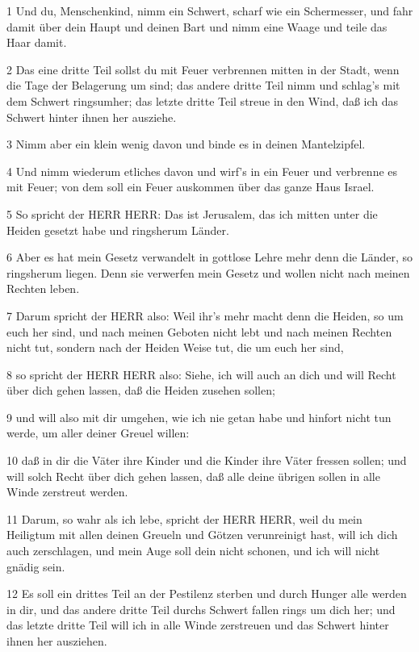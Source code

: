 \par 1 Und du, Menschenkind, nimm ein Schwert, scharf wie ein Schermesser, und fahr damit über dein Haupt und deinen Bart und nimm eine Waage und teile das Haar damit.
\par 2 Das eine dritte Teil sollst du mit Feuer verbrennen mitten in der Stadt, wenn die Tage der Belagerung um sind; das andere dritte Teil nimm und schlag's mit dem Schwert ringsumher; das letzte dritte Teil streue in den Wind, daß ich das Schwert hinter ihnen her ausziehe.
\par 3 Nimm aber ein klein wenig davon und binde es in deinen Mantelzipfel.
\par 4 Und nimm wiederum etliches davon und wirf's in ein Feuer und verbrenne es mit Feuer; von dem soll ein Feuer auskommen über das ganze Haus Israel.
\par 5 So spricht der HERR HERR: Das ist Jerusalem, das ich mitten unter die Heiden gesetzt habe und ringsherum Länder.
\par 6 Aber es hat mein Gesetz verwandelt in gottlose Lehre mehr denn die Länder, so ringsherum liegen. Denn sie verwerfen mein Gesetz und wollen nicht nach meinen Rechten leben.
\par 7 Darum spricht der HERR also: Weil ihr's mehr macht denn die Heiden, so um euch her sind, und nach meinen Geboten nicht lebt und nach meinen Rechten nicht tut, sondern nach der Heiden Weise tut, die um euch her sind,
\par 8 so spricht der HERR HERR also: Siehe, ich will auch an dich und will Recht über dich gehen lassen, daß die Heiden zusehen sollen;
\par 9 und will also mit dir umgehen, wie ich nie getan habe und hinfort nicht tun werde, um aller deiner Greuel willen:
\par 10 daß in dir die Väter ihre Kinder und die Kinder ihre Väter fressen sollen; und will solch Recht über dich gehen lassen, daß alle deine übrigen sollen in alle Winde zerstreut werden.
\par 11 Darum, so wahr als ich lebe, spricht der HERR HERR, weil du mein Heiligtum mit allen deinen Greueln und Götzen verunreinigt hast, will ich dich auch zerschlagen, und mein Auge soll dein nicht schonen, und ich will nicht gnädig sein.
\par 12 Es soll ein drittes Teil an der Pestilenz sterben und durch Hunger alle werden in dir, und das andere dritte Teil durchs Schwert fallen rings um dich her; und das letzte dritte Teil will ich in alle Winde zerstreuen und das Schwert hinter ihnen her ausziehen.
